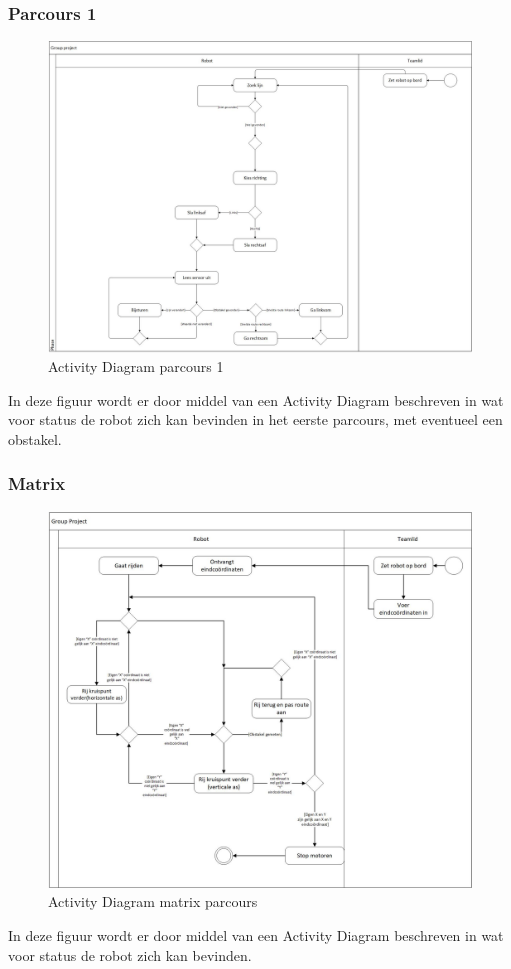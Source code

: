 \documentclass[12pt]{article}
\begin{document}
		\subsubsection{Parcours 1}
			\begin{center}
				\begin{figure}
					\includegraphics[scale=.4]{ActivityDiagramParcours1}
					\caption{Activity Diagram parcours 1}
				\end{figure}
			\end{center}
			In deze figuur wordt er door middel van een Activity Diagram beschreven in wat voor status de robot zich kan bevinden in het eerste parcours, met eventueel een obstakel.
\newpage
		\subsubsection{Matrix}
			\begin{center}
				\begin{figure}
					\includegraphics[scale=.5]{ActivityDiagramMatrix}
					\caption{Activity Diagram matrix parcours}
				\end{figure}
			\end{center}
			In deze figuur wordt er door middel van een Activity Diagram beschreven in wat voor status de robot zich kan bevinden.
		\newpage
\end{document}

